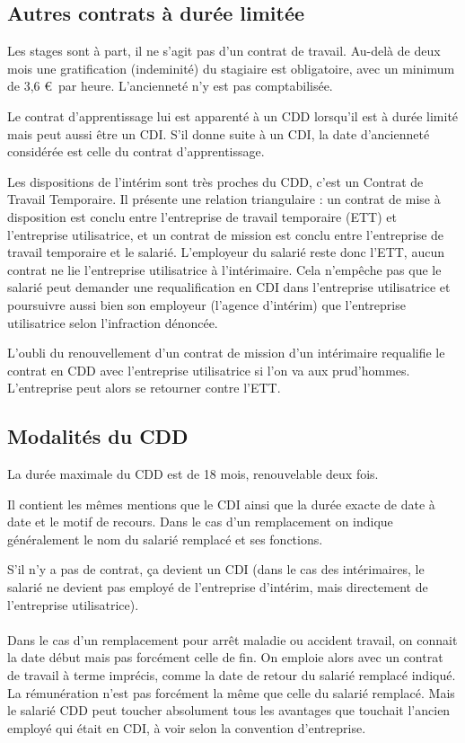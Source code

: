 \subsection{Autres contrats à durée limitée}
	Les stages sont à part, il ne s'agit pas d'un contrat de travail.
	Au-delà de deux mois une gratification (indeminité) du stagiaire est obligatoire, avec un minimum de 3,6 \euro\ par heure.
	L'ancienneté n'y est pas comptabilisée.
	
	Le contrat d'apprentissage lui est apparenté à un CDD lorsqu'il est à durée limité mais peut aussi être un CDI.
	S'il donne suite à un CDI, la date d'ancienneté considérée est celle du contrat d'apprentissage.

	Les dispositions de l'intérim sont très proches du CDD, c'est un Contrat de Travail Temporaire.
	Il présente une relation triangulaire : un contrat de mise à disposition est conclu entre l'entreprise de travail temporaire (ETT) et l'entreprise utilisatrice, et un contrat de mission est conclu entre l'entreprise de travail temporaire et le salarié.
	L'employeur du salarié reste donc l'ETT, aucun contrat ne lie l'entreprise utilisatrice à l'intérimaire.
	Cela n'empêche pas que le salarié peut demander une requalification en CDI dans l'entreprise utilisatrice et poursuivre aussi bien son employeur (l'agence d'intérim) que l'entreprise utilisatrice selon l'infraction dénoncée.
	
	L'oubli du renouvellement d'un contrat de mission d'un intérimaire requalifie le contrat en CDD avec l'entreprise utilisatrice si l'on va aux prud'hommes.
	L'entreprise peut alors se retourner contre l'ETT.


\subsection{Modalités du CDD}
	La durée maximale du CDD est de 18 mois, renouvelable deux fois.

	Il contient les mêmes mentions que le CDI ainsi que la durée exacte de date à date et le motif de recours.
	Dans le cas d'un remplacement on indique généralement le nom du salarié remplacé et ses fonctions.
	
	S’il n’y a pas de contrat, ça devient un CDI (dans le cas des intérimaires, le salarié ne devient pas employé de l'entreprise d’intérim, mais directement de l'entreprise utilisatrice).

	\paragraph{}
	Dans le cas d’un remplacement pour arrêt maladie ou accident travail, on connait la date début mais pas forcément celle de fin.
	On emploie alors avec un contrat de travail à terme imprécis, comme la date de retour du salarié remplacé indiqué.
	La rémunération n’est pas forcément la même que celle du salarié remplacé.
	Mais le salarié CDD peut toucher absolument tous les avantages que touchait l’ancien employé qui était en CDI, à voir selon la convention d'entreprise.
	
